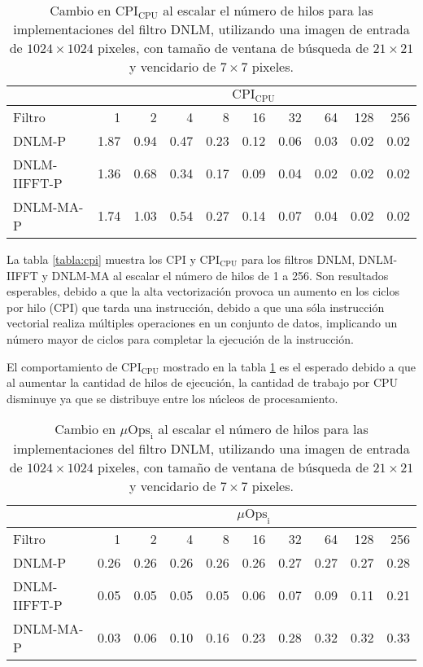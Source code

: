\begin{table}[htb]
\centering
\caption[Cambio en $\text{CPI}_{\text{CPU}}$ al escalar el n\'umero de hilos]{Cambio en $\text{CPI}_{\text{CPU}}$ al escalar el n\'umero de hilos para las implementaciones del filtro DNLM, utilizando una imagen de entrada de $1024 \times 1024$ pixeles, con tama\~no de ventana de búsqueda de $21 \times 21$ y vencidario de $7 \times 7$ pixeles. \label{tabla:cpic}}
\begin{tabular}{lrrrrrrrrr}
& \multicolumn{9}{c}{$\text{CPI}_{\text{CPU}}$} \tabularnewline
\hline
 Filtro & 1 & 2 & 4 & 8 & 16 & 32 & 64 & 128 & 256 \tabularnewline
\hline
DNLM-P & 1.87 & 0.94 & 0.47 & 0.23 & 0.12 & 0.06 & 0.03 & 0.02 & 0.02 \tabularnewline
DNLM-IIFFT-P & 1.36 & 0.68 & 0.34 & 0.17 & 0.09 & 0.04 & 0.02 & 0.02 & 0.02 \tabularnewline
DNLM-MA-P & 1.74 & 1.03 & 0.54 & 0.27 & 0.14 & 0.07 & 0.04 & 0.02 & 0.02 \tabularnewline
\end{tabular}
\end{table}
  
  
La tabla \ref{tabla:cpi} muestra los CPI y $\text{CPI}_{\text{CPU}}$ para los filtros DNLM, DNLM-IIFFT y DNLM-MA al escalar el n\'umero de hilos de 1 a 256. Son resultados esperables, debido a que la alta vectorizaci\'on provoca un aumento en los ciclos por hilo (CPI) que tarda una instrucci\'on, debido a que una s\'ola instrucci\'on vectorial realiza m\'ultiples operaciones en un conjunto de datos, implicando un n\'umero mayor de ciclos para completar la ejecuci\'on de la instrucci\'on. 

El comportamiento de $\text{CPI}_{\text{CPU}}$ mostrado en la tabla \ref{tabla:cpic}  es el esperado debido a  que al aumentar la cantidad de hilos de ejecuci\'on, la cantidad de trabajo por CPU disminuye ya que se distribuye entre los n\'ucleos de procesamiento. 
  

  
\begin{table}[htb]
\centering
\caption[Cambio en intensidad de  micro-operaciones al escalar el n\'umero de hilos]{Cambio en  $\mu\text{Ops}_{\text{i}}$ al escalar el n\'umero de hilos para las implementaciones del filtro DNLM, utilizando una imagen de entrada de $1024 \times 1024$ pixeles, con tama\~no de ventana de búsqueda de $21 \times 21$ y vencidario de $7 \times 7$ pixeles. \label{tabla:ucode}}
\begin{tabular}{lrrrrrrrrr}
& \multicolumn{9}{c}{$\mu\text{Ops}_{\text{i}}$} \tabularnewline
\hline
 Filtro & 1 & 2 & 4 & 8 & 16 & 32 & 64 & 128 & 256 \tabularnewline
\hline
DNLM-P & 0.26 & 0.26 & 0.26 & 0.26 & 0.26 & 0.27 & 0.27 & 0.27 & 0.28 \tabularnewline
DNLM-IIFFT-P & 0.05 & 0.05 & 0.05 & 0.05 & 0.06 & 0.07 & 0.09 & 0.11 & 0.21 \tabularnewline
DNLM-MA-P & 0.03 & 0.06 & 0.10 & 0.16 & 0.23 & 0.28 & 0.32 & 0.32 & 0.33 \tabularnewline
\end{tabular}
\end{table}

